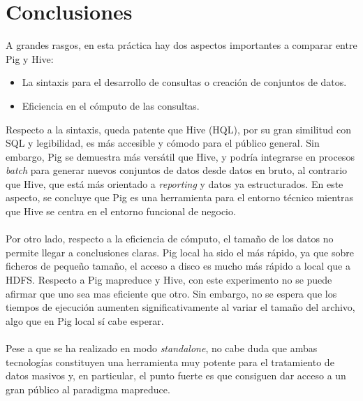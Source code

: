 \section*{Conclusiones}
A grandes rasgos, en esta práctica hay dos aspectos importantes a comparar entre Pig y Hive: 
\begin{itemize}
	\item La sintaxis para el desarrollo de consultas o creación de conjuntos de datos.
	\item Eficiencia en el cómputo de las consultas.
\end{itemize}
Respecto a la sintaxis, queda patente que Hive (HQL), por su gran similitud con SQL y legibilidad, es más accesible y cómodo para el público general. Sin embargo, Pig se demuestra más versátil que Hive, y podría integrarse en procesos \textit{batch} para generar nuevos conjuntos de datos desde datos en bruto, al contrario que Hive, que está más orientado a \textit{reporting} y datos ya estructurados. En este aspecto, se concluye que Pig es una herramienta para el entorno técnico mientras que Hive se centra en el entorno funcional de negocio.\\\\
Por otro lado, respecto a la eficiencia de cómputo, el tamaño de los datos no permite llegar a conclusiones claras. Pig local ha sido el más rápido, ya que sobre ficheros de pequeño tamaño, el acceso a disco es mucho más rápido a local que a HDFS. Respecto a Pig mapreduce y Hive, con este experimento no se puede afirmar que uno sea mas eficiente que otro. Sin embargo, no se espera que los tiempos de ejecución aumenten significativamente al variar el tamaño del archivo, algo que en Pig local sí cabe esperar.\\\\
Pese a que se ha realizado en modo \textit{standalone}, no cabe duda que ambas tecnologías constituyen una herramienta muy potente para el tratamiento de datos masivos y, en particular, el punto fuerte es que consiguen dar acceso a un gran público al paradigma mapreduce.
\pagebreak
